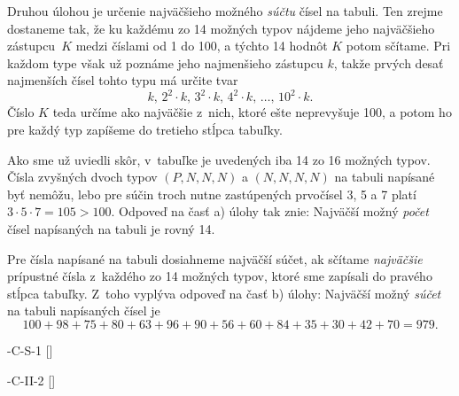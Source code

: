 {Druhou úlohou je určenie najväčšieho možného {\it súčtu\/} čísel
na tabuli. Ten zrejme dostaneme tak, že ku každému zo 14 možných
typov nájdeme jeho najväčšieho zástupcu~$K$ medzi číslami od 1 do 100,
a týchto 14 hodnôt $K$ potom sčítame. Pri každom type však už poznáme jeho
najmenšieho zástupcu $k$, takže prvých desať najmenších čísel
tohto typu má určite tvar
$$
k,\, 2^2\cdot k,\, 3^2\cdot k,\, 4^2\cdot k,\,\dots,\,10^2\cdot k.
$$
Číslo $K$ teda určíme ako najväčšie z~nich, ktoré ešte
neprevyšuje 100, a potom ho pre každý typ zapíšeme do tretieho stĺpca
tabuľky.

Ako sme už uviedli skôr, v~tabuľke je uvedených iba 14 zo 16
možných typov. Čísla zvyšných dvoch typov $(P,N,N,N)$ a $(N,N,N,N)$
na tabuli napísané byť nemôžu, lebo pre
súčin troch nutne zastúpených prvočísel 3, 5 a 7 platí
$3\cdot5\cdot7=105>100$. Odpoveď na časť a) úlohy tak znie:
Najväčší možný {\it počet\/} čísel napísaných na tabuli je rovný 14.

Pre čísla napísané na tabuli dosiahneme najväčší súčet, ak
sčítame {\it najväčšie\/} prípustné čísla z~každého zo 14 možných typov,
ktoré sme zapísali do pravého stĺpca tabuľky.
Z~toho vyplýva odpoveď na časť b) úlohy:
Najväčší možný {\it súčet\/} na tabuli napísaných čísel je
$$
100+98+75+80+63+96+90+56+60+84+35+30+42+70=979.
$$

-C-S-1
[]

-C-II-2
[]

}

